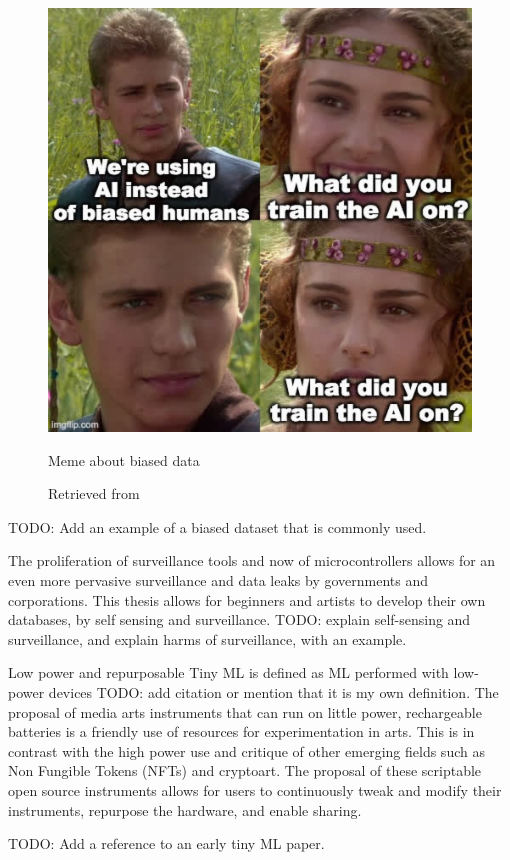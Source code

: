 \begin{figure}[ht]
  \centering
  \includegraphics[width=0.75\linewidth,height=0.25\textheight,keepaspectratio]{images/meme-star-wars.jpg}
  \caption{Meme about biased data}
  \caption*{Retrieved from \cite{website-twitter-janellecshane-meme}}
  \label{fig:meme-star-wars}
\end{figure}

TODO: Add an example of a biased dataset that is commonly used.

The proliferation of surveillance tools and now of microcontrollers allows for an even more pervasive surveillance and data leaks by governments and corporations. This thesis allows for beginners and artists to develop their own databases, by self sensing and surveillance. TODO: explain self-sensing and surveillance, and explain harms of surveillance, with an example.

Low power and repurposable
Tiny \acrshort{ML} is defined as \acrshort{ML} performed with low-power devices TODO: add citation or mention that it is my own definition. The proposal of media arts instruments that can run on little power, rechargeable batteries is a friendly use of resources for experimentation in arts. This is in contrast with the high power use and critique of other emerging fields such as Non Fungible Tokens (NFTs) and cryptoart. The proposal of these scriptable open source instruments allows for users to continuously tweak and modify their instruments, repurpose the hardware, and enable sharing.

TODO: Add a reference to an early tiny ML paper.

